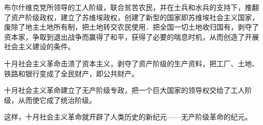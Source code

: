 布尔什维克党所领导的工人阶级，联合贫苦农民，并在士兵和水兵的支持下，推翻了资产阶级政权，建立了苏维埃政权，创建了新型的国家即苏维埃社会主义国家，废除了地主土地所有制，把土地转交农民使用．把全国一切土地收归国有，剥夺了资本家，争取到退出战争而赢得了和平，获得了必要的喘息时机，从而创造了开展社会主义建设的条件。

十月社会主义革命击溃了资本主义，剥夺了资产阶级的生产资料，把工厂、土地、铁路和银行变成了全民财产，即公共财产。

十月社会主义革命建立了无产阶级专政，把一个巨大国家的领导权交给了工人阶级，从而使它成了统治阶级。

这样，十月社会主义革命就开辟了人类历史的新纪元——无产阶级革命的纪元。

